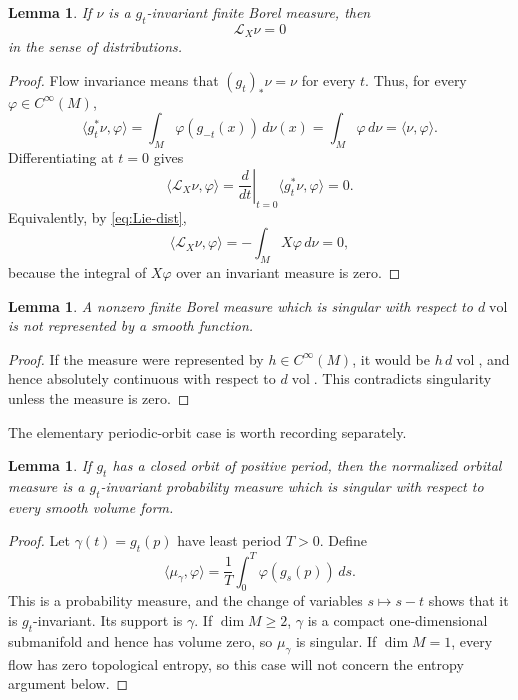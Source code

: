\documentclass[11pt]{article}
\newtheorem{lemma}[theorem]{Lemma}
\theoremstyle{definition}
\theoremstyle{remark}
\newcommand{\Cinf}{C^\infty}
\newcommand{\vol}{\operatorname{vol}}
\begin{document}
\begin{lemma}\label{lem:measure-solves}
If \(\nu\) is a \(g_t\)-invariant finite Borel measure, then
\[
\mathcal L_X\nu=0
\]
in the sense of distributions.
\end{lemma}

\begin{proof}
Flow invariance means that \( (g_t)_*\nu=\nu\) for every \(t\).
Thus, for every \(\varphi\in\Cinf(M)\),
\[
\langle g_t^*\nu,\varphi\rangle
 =\int_M \varphi(g_{-t}(x))\,d\nu(x)
 =\int_M\varphi\,d\nu
 =\langle\nu,\varphi\rangle .
\]
Differentiating at \(t=0\) gives
\[
\langle\mathcal L_X\nu,\varphi\rangle
 =\left.\frac{d}{dt}\right|_{t=0}
   \langle g_t^*\nu,\varphi\rangle=0.
\]
Equivalently, by \eqref{eq:Lie-dist},
\[
\langle\mathcal L_X\nu,\varphi\rangle
 =-\int_M X\varphi\,d\nu=0,
\]
because the integral of \(X\varphi\) over an invariant measure is zero.
\end{proof}

\begin{lemma}\label{lem:singular-not-smooth}
A nonzero finite Borel measure which is singular with respect to
\(d\vol\) is not represented by a smooth function.
\end{lemma}

\begin{proof}
If the measure were represented by \(h\in\Cinf(M)\), it would be
\(h\,d\vol\), and hence absolutely continuous with respect to
\(d\vol\).  This contradicts singularity unless the measure is zero.
\end{proof}

The elementary periodic-orbit case is worth recording separately.

\begin{lemma}\label{lem:periodic-measure}
If \(g_t\) has a closed orbit of positive period, then the normalized
orbital measure is a \(g_t\)-invariant probability measure which is
singular with respect to every smooth volume form.
\end{lemma}

\begin{proof}
Let \(\gamma(t)=g_t(p)\) have least period \(T>0\).  Define
\[
\langle\mu_\gamma,\varphi\rangle
   =\frac1T\int_0^T\varphi(g_s(p))\,ds .
\]
This is a probability measure, and the change of variables
\(s\mapsto s-t\) shows that it is \(g_t\)-invariant.  Its support is
\(\gamma\).  If \(\dim M\geq2\), \(\gamma\) is a compact
one-dimensional submanifold and hence has volume zero, so
\(\mu_\gamma\) is singular.  If \(\dim M=1\), every flow has zero
topological entropy, so this case will not concern the entropy
argument below.
\end{proof}
\end{document}
